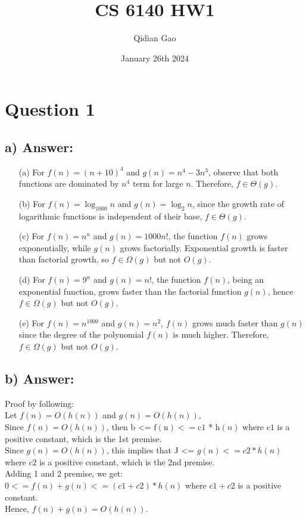 \documentclass{article}
\title{CS 6140 HW1}
\author{Qidian Gao}
\date{January 26th 2024}
\begin{document}
\maketitle
\section{Question 1}
\subsection{a) \textbf{Answer: }}\begin{enumerate}
    \item[(a)] For $f(n) = (n+10)^4$ and $g(n) = n^4 - 3n^3$, observe that both functions are dominated by $n^4$ term for large $n$. Therefore, $f \in \Theta(g)$.
    \item[(b)] For $f(n) = \log_{1000} n$ and $g(n) = \log_2 n$, since the growth rate of logarithmic functions is independent of their base, $f \in \Theta(g)$.
    \item[(c)] For $f(n) = n^n$ and $g(n) = 1000n!$, the function $f(n)$ grows exponentially, while $g(n)$ grows factorially. Exponential growth is faster than factorial growth, so $f \in \Omega(g)$ but not $O(g)$.
    \item[(d)] For $f(n) = 9^n$ and $g(n) = n!$, the function $f(n)$, being an exponential function, grows faster than the factorial function $g(n)$, hence $f \in \Omega(g)$ but not $O(g)$.
    \item[(e)] For $f(n) = n^{1000}$ and $g(n) = n^2$, $f(n)$ grows much faster than $g(n)$ since the degree of the polynomial $f(n)$ is much higher. Therefore, $f \in \Omega(g)$ but not $O(g)$.
\end{enumerate}
\subsection{b) \textbf{Answer:} }Proof by following:\\
Let $f(n)=O(h(n))$ and $g(n)=O(h(n))$,\\
Since $f(n)=O(h(n))$, then b <= $\mathrm{f}(\mathrm{n})<=\mathrm{c1}$ * $\mathrm{h}(n)$ where $\mathrm{c} 1$ is a positive constant, which is the 1st premise.\\
Since $g(n)=O(h(n))$, this implies that J <= $g(n)<=c 2 * h(n)$ where $c 2$ is a positive constant, which is the 2nd premise.\\
Adding 1 and 2 premise, we get:\\
$0<=f(n)+g(n)<=(c 1+c 2) * h(n)$ where $c 1+c 2$ is a positive constant.\\
Hence, $f(n)+g(n)=O(h(n))$.
\end{document}
